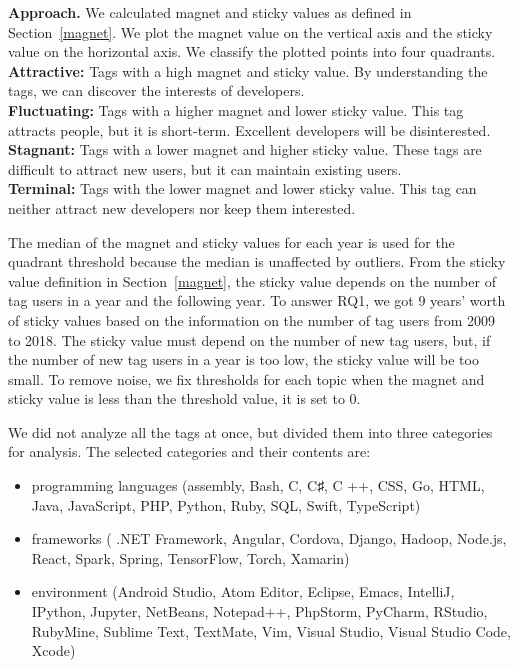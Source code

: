 \documentclass[conference]{IEEEtran}
\begin{document}
\noindent
\textbf{Approach.}
We calculated magnet and sticky values as defined in Section~\ref{magnet}. We plot the magnet value on the vertical axis and the sticky value on the horizontal axis. We classify the plotted points into four quadrants.\\
\textbf
{Attractive:} Tags with a high magnet and sticky value. By understanding the tags, we can discover the interests of developers.\\
\textbf{Fluctuating:} Tags with a higher magnet and lower sticky value. This tag attracts people, but it is short-term. Excellent developers will be disinterested.\\
\textbf{Stagnant:} Tags with a lower magnet and higher sticky value. These tags are difficult to attract new users, but it can maintain existing users.\\
\textbf{Terminal:} Tags with the lower magnet and lower sticky value. This tag can neither attract new developers nor keep them interested.

The median of the magnet and sticky values for each year is used for the quadrant threshold because the median is unaffected by outliers. From the sticky value definition in Section~\ref{magnet}, the sticky value depends on the number of tag users in a year and the following year. To answer RQ1, we got 9 years’ worth of sticky values based on the information on the number of tag users from 2009 to 2018. The sticky value must depend on the number of new tag users, but, if the number of new tag users in a year is too low, the sticky value will be too small. To remove noise, we fix thresholds for each topic when the magnet and sticky value is less than the threshold value, it is set to 0.


We did not analyze all the tags at once, but divided them into three categories for analysis. The selected categories and their contents are:
\begin{itemize}
\item programming languages ​​(assembly, Bash, C, C♯, C ++, CSS, Go, HTML, Java, JavaScript, PHP, Python, Ruby, SQL, Swift, TypeScript)
\item frameworks ( .NET Framework, Angular, Cordova, Django, Hadoop, Node.js, React, Spark, Spring, TensorFlow, Torch, Xamarin)
\item environment (Android Studio, Atom Editor, Eclipse, Emacs, IntelliJ, IPython, Jupyter, NetBeans, Notepad++, PhpStorm, PyCharm, RStudio, RubyMine, Sublime Text, TextMate, Vim, Visual Studio, Visual Studio Code, Xcode)
\end{itemize}
\end{document}
